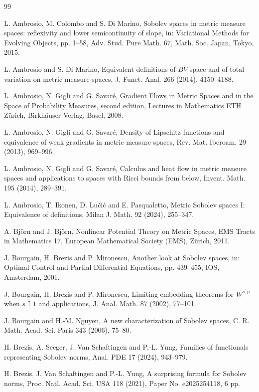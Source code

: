 \documentclass[11pt]{amsart}
\theoremstyle{definition}
\theoremstyle{remark}
\numberwithin{equation}{section}
\begin{document}
\begin{thebibliography}{99}

L. Ambrosio, M. Colombo and S. Di Marino,
Sobolev spaces in metric measure spaces: reflexivity and lower semicontinuity of slope,
in: Variational Methods for Evolving Objects, pp. 1--58,
Adv. Stud. Pure Math. 67, Math. Soc. Japan, Tokyo, 2015.


L. Ambrosio and S. Di Marino,
Equivalent definitions of $BV$ space and of total variation on metric measure spaces,
J. Funct. Anal. 266 (2014), 4150--4188.


L. Ambrosio, N. Gigli and G. Savar\'e,
Gradient Flows in Metric Spaces and in the Space of Probability Measures,
second edition, Lectures in Mathematics ETH Z\"urich,
Birkh\"auser Verlag, Basel, 2008.


L. Ambrosio, N. Gigli and G. Savar\'e,
Density of Lipschitz functions and equivalence of weak gradients in metric measure spaces,
Rev. Mat. Iberoam. 29 (2013), 969--996.


L. Ambrosio, N. Gigli and G. Savar\'e,
Calculus and heat flow in metric measure spaces and applications to spaces with Ricci bounds
from below,
Invent. Math. 195 (2014), 289--391.


L. Ambrosio, T. Ikonen, D. Lu\v ci\'c and E. Pasqualetto,
Metric Sobolev spaces I: Equivalence of definitions,
Milan J. Math. 92 (2024), 255--347.


A. Bj\"orn and J. Bj\"orn,
Nonlinear Potential Theory on Metric Spaces,
EMS Tracts in Mathematics 17, European Mathematical Society (EMS), Z\"urich, 2011.


J. Bourgain, H. Brezis and P. Mironescu,
Another look at Sobolev spaces,
in: Optimal Control and Partial Differential Equations, pp. 439--455,
IOS, Amsterdam, 2001.


J. Bourgain, H. Brezis and P. Mironescu,
Limiting embedding theorems for $W^{s,p}$ when $s\uparrow 1$ and applications,
J. Anal. Math. 87 (2002), 77--101.


J. Bourgain and H.-M. Nguyen,
A new characterization of Sobolev spaces,
C. R. Math. Acad. Sci. Paris 343 (2006), 75--80.


H. Brezis, A. Seeger, J. Van Schaftingen and P.-L. Yung,
Families of functionals representing Sobolev norms,
Anal. PDE 17 (2024), 943--979.


H. Brezis, J. Van Schaftingen and P.-L. Yung,
A surprising formula for Sobolev norms,
Proc. Natl. Acad. Sci. USA 118 (2021), Paper No. e2025254118, 6 pp.



\end{thebibliography}
\end{document}
